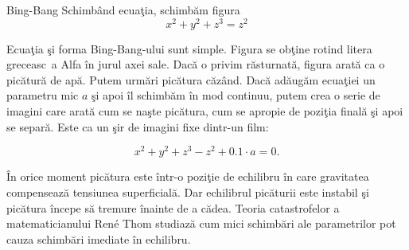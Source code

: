 \begin{surferPage}{Bing-Bang}
Schimb\^and ecua\c tia, schimb\u am figura \\

\smallskip
\[x^2	+ y^2	+ z^3	= z^2\]

\singlespacing
Ecua\c tia \c si forma Bing-Bang-ului sunt simple. Figura se ob\c tine rotind litera greceasc\ a Alfa \^in jurul axei sale. Dac\u a o privim
r\u asturnat\u a, figura arat\u a ca o pic\u atur\u a de ap\u a. Putem urm\u ari pic\u atura c\u az\^and.
\newline
Dac\u a ad\u aug\u am ecua\c tiei un parametru mic $a$ \c si apoi \^il schimb\u am  \^in mod continuu, putem crea o serie de imagini care arat\u a
cum se na\c ste pic\u atura, cum se apropie de pozi\c tia final\u a \c si apoi se separ\u a. Este ca un \c sir de imagini fixe dintr-un film: 

\[x^2	+ y^2	+ z^3	-z^2+0.1\cdot a=0.\]

\^In orice moment pic\u atura este \^intr-o pozi\c tie de echilibru \^in care gravitatea compenseaz\u a tensiunea superficial\u a. Dar echilibrul pic\u aturii
este instabil \c si pic\u atura \^incepe s\u a tremure \^inainte de a c\u adea. Teoria catastrofelor a matematicianului Ren\'e Thom studiaz\u a cum
mici schimb\u ari ale parametrilor pot cauza schimb\u ari imediate \^in echilibru.

\end{surferPage}
